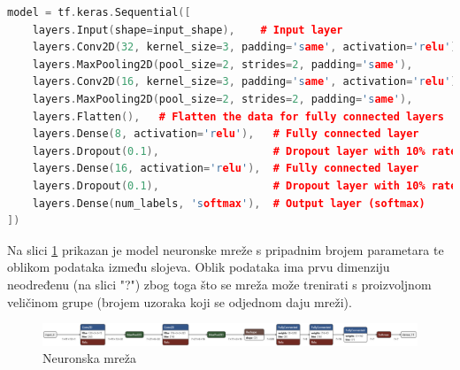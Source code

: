 \begin{lstlisting}[language=C++, caption=Struktura mreže, label=code:network]
model = tf.keras.Sequential([
    layers.Input(shape=input_shape),    # Input layer
    layers.Conv2D(32, kernel_size=3, padding='same', activation='relu'),
    layers.MaxPooling2D(pool_size=2, strides=2, padding='same'),
    layers.Conv2D(16, kernel_size=3, padding='same', activation='relu'),
    layers.MaxPooling2D(pool_size=2, strides=2, padding='same'),
    layers.Flatten(),   # Flatten the data for fully connected layers
    layers.Dense(8, activation='relu'),   # Fully connected layer
    layers.Dropout(0.1),                  # Dropout layer with 10% rate
    layers.Dense(16, activation='relu'),  # Fully connected layer
    layers.Dropout(0.1),                  # Dropout layer with 10% rate
    layers.Dense(num_labels, 'softmax'),  # Output layer (softmax)
])
\end{lstlisting}

Na slici \ref{pic:struktura} prikazan je model neuronske mreže s pripadnim brojem
parametara te oblikom podataka između slojeva. Oblik podataka ima prvu dimenziju 
neodređenu (na slici "?") zbog toga što se mreža može trenirati s proizvoljnom 
veličinom grupe (brojem uzoraka koji se odjednom daju mreži).

\begin{figure}[htb]
    \centering
    \includegraphics[width=1\linewidth]{Chapters/neuronska_mreza/struktura/model.png} 
    \caption{Neuronska mreža \cite{netron}}
    \label{pic:struktura}
\end{figure}

